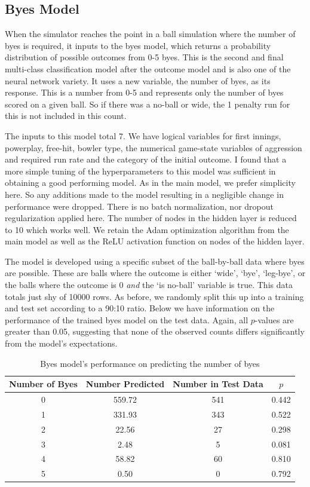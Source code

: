\subsection{Byes Model}

When the simulator reaches the point in a ball simulation where the number of byes is required, it inputs to the byes model, which returns a probability distribution of possible outcomes from 0-5 byes. This is the second and final multi-class classification model after the outcome model and is also one of the neural network variety. It uses a new variable, the number of byes, as its response. This is a number from 0-5 and represents only the number of byes scored on a given ball. So if there was a no-ball or wide, the 1 penalty run for this is not included in this count.

The inputs to this model total 7. We have logical variables for first innings, powerplay, free-hit, bowler type, the numerical game-state variables of aggression and required run rate and the category of the initial outcome. I found that a more simple tuning of the hyperparameters to this model was sufficient in obtaining a good performing model. As in the main model, we prefer simplicity here. So any additions made to the model resulting in a negligible change in performance were dropped. There is no batch normalization, nor dropout regularization applied here. The number of nodes in the hidden layer is reduced to 10 which works well. We retain the Adam optimization algorithm from the main model as well as the ReLU activation function on nodes of the hidden layer.

The model is developed using a specific subset of the ball-by-ball data where byes are possible. These are balls where the outcome is either `wide', `bye', `leg-bye', or the balls where the outcome is 0 \textit{and} the `is no-ball' variable is true. This data totals just shy of 10000 rows. As before, we randomly split this up into a training and test set according to a 90:10 ratio. Below we have information on the performance of the trained byes model on the test data. Again, all $p$-values are greater than 0.05, suggesting that none of the observed counts differs significantly from the model's expectations.

\begin{table}[h]
\vspace{0.5em}
\centering
\begin{tabular} {c c c c} \toprule
    {Number of Byes} & {Number Predicted} & {Number in Test Data} & {$p$} \\ \midrule
     0 & 559.72 & 541 & 0.442 \\
     1 & 331.93 & 343 & 0.522 \\
     2 & 22.56 & 27 & 0.298 \\
     3 & 2.48 & 5 & 0.081 \\
     4 & 58.82 & 60 & 0.810 \\
     5 & 0.50 & 0 & 0.792 \\ \bottomrule
\end{tabular}
\caption{Byes model's performance on predicting the number of byes }
\label{table: byes}
\end{table}

